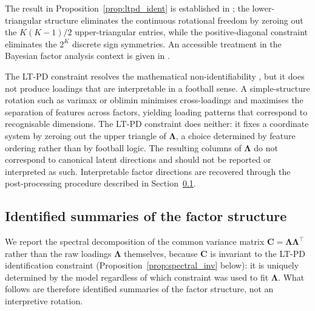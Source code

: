 The result in Proposition~\ref{prop:ltpd_ident} is established in \cite{anderson1956statistical}; the lower-triangular structure eliminates the continuous rotational freedom by zeroing out the $K(K-1)/2$ upper-triangular entries, while the positive-diagonal constraint eliminates the $2^K$ discrete sign symmetries. An accessible treatment in the Bayesian factor analysis context is given in \cite{geweke1996measuring}.

\begin{remark}
\label{rem:ltpd_notinterp}
The LT-PD constraint resolves the mathematical non-identifiability \cite{anderson1956statistical,geweke1996measuring}, but it does not produce loadings that are interpretable in a football sense. A simple-structure rotation such as varimax or oblimin minimises cross-loadings and maximises the separation of features across factors, yielding loading patterns that correspond to recognisable dimensions. The LT-PD constraint does neither: it fixes a coordinate system by zeroing out the upper triangle of $\boldsymbol{\Lambda}$, a choice determined by feature ordering rather than by football logic. The resulting columns of $\boldsymbol{\Lambda}$ do not correspond to canonical latent directions and should not be reported or interpreted as such. Interpretable factor directions are recovered through the post-processing procedure described in Section~\ref{sec:spectral}.
\end{remark}

\subsection{Identified summaries of the factor structure}
\label{sec:spectral}

We report the spectral decomposition of the common variance matrix $\mathbf{C} = \boldsymbol{\Lambda}\boldsymbol{\Lambda}^\top$ rather than the raw loadings $\boldsymbol{\Lambda}$ themselves, because $\mathbf{C}$ is invariant to the LT-PD identification constraint (Proposition~\ref{prop:spectral_inv} below): it is uniquely determined by the model regardless of which constraint was used to fit $\boldsymbol{\Lambda}$. What follows are therefore identified summaries of the factor structure, not an interpretive rotation.

